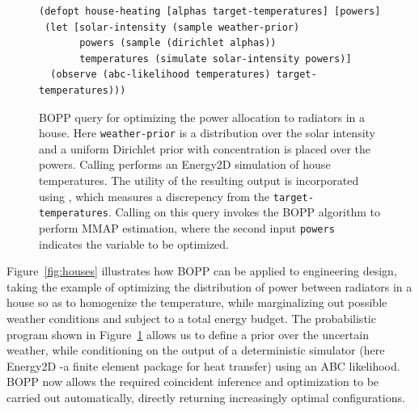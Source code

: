 \begin{figure}[p]
{		%
	}
\end{figure}

\begin{figure}[p]
	\begin{lstlisting}[basicstyle=\ttfamily]
(defopt house-heating [alphas target-temperatures] [powers]
 (let [solar-intensity (sample weather-prior)
       powers (sample (dirichlet alphas))
       temperatures (simulate solar-intensity powers)]
  (observe (abc-likelihood temperatures) target-temperatures)))
	\end{lstlisting}	
	\vspace{-6pt}
	\caption{BOPP query for optimizing the power allocation to radiators in a house.  Here \lstinline{weather-prior} is a distribution over the solar intensity and a uniform Dirichlet prior with concentration  is placed over the powers. Calling \simulatec performs an Energy2D simulation of house temperatures. The utility of the resulting output is incorporated using \abcl, which measures a discrepency from the \texttt{target-temperatures}. Calling \doopt on this query invokes the BOPP algorithm to perform MMAP estimation, where the second input \lstinline{powers} indicates the variable to be optimized. \label{fig:house-heating-code}}
\end{figure}

Figure~\ref{fig:houses} illustrates how BOPP can be applied to engineering design, taking the example of optimizing the distribution of power between radiators in a house so as to homogenize the temperature, while marginalizing out possible weather conditions and subject to a total energy budget. The probabilistic program shown in Figure~\ref{fig:house-heating-code} allows us to define a prior over the uncertain weather, while conditioning on the output of a deterministic simulator (here Energy2D \citep{xie2012energy2d}-a finite element package for heat transfer) using an ABC likelihood.  BOPP now allows the required coincident inference and optimization to be carried out automatically, directly returning increasingly optimal configurations. 

